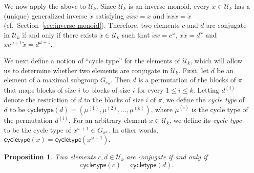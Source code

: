 \documentclass[10pt]{amsart}
\newtheorem{prop}[theorem]{Proposition}
\theoremstyle{definition}
\theoremstyle{remark}
\newcommand{\defncolor}{\color{darkred}}
\newcommand{\defn}[1]{{\defncolor\emph{#1}}} %
\newcommand{\cf}{cf.\ }
\begin{document}
We now apply the above to $\mathcal{U}_k$.
Since $\mathcal{U}_k$ is an inverse monoid, every
$x\in \mathcal{U}_k$ has a (unique) generalized inverse $\widetilde{x}$
satisfying $x\widetilde{x}x = x$ and $\widetilde{x}x\widetilde{x}
= \widetilde{x}$ (\cf Section~\ref{sec:inverse-monoid}).
Therefore, two elements $c$ and $d$ are conjugate in $\mathcal{U}_k$ if and only if there
exists $x \in \mathcal{U}_k$ such that
$\widetilde{x}x = c^{\omega}$,
$x \widetilde{x} = d^{\omega}$
and $x c^{\omega +1} \widetilde{x} = d^{\omega + 1}$.

We next define a notion of ``cycle type'' for the elements of $\mathcal{U}_k$,
which will allow us to determine whether two elements are conjugate in $\mathcal{U}_k$.
First, let $d$ be an element of a maximal subgroup $G_{e_\pi}$.
Then $d$ is a permutation of the blocks of $\pi$ that maps blocks of size $i$
to blocks of size $i$ for every $1 \leqslant i \leqslant k$.
Letting $d^{(i)}$ denote the restriction of $d$ to the blocks of size $i$ of $\pi$,
we define the \defn{cycle type} of $d$ to be $\mathsf{cycletype}(d) = (\mu^{(1)}, \mu^{(2)}, \ldots, \mu^{(k)})$,
where $\mu^{(i)}$ is the cycle type of the permutation $d^{(i)}$.
For an arbitrary element $x \in \mathcal{U}_k$, we define its
\defn{cycle type} to be the cycle type of $x^{\omega +1} \in G_{x^\omega}$.
In other words, $\mathsf{cycletype}(x) = \mathsf{cycletype}(x^{\omega + 1})$.

\begin{prop}\label{prop:conjugacyclasses}
    Two elements $c, d \in \mathcal{U}_k$ are conjugate if and only if
    \[
        \mathsf{cycletype}(c) = \mathsf{cycletype}(d).
    \]
\end{prop}
\end{document}
